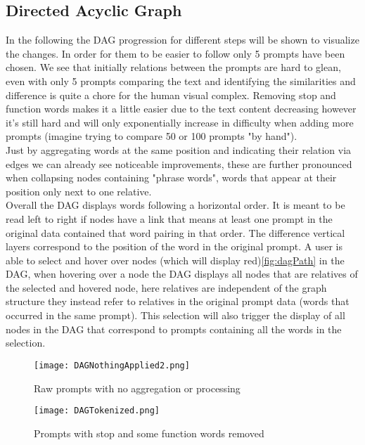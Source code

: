 \documentclass[
  a4paper,  %
  twoside,  %
  bibliography=totoc,
  headsepline,
  cleardoublepage=empty,
  parskip=half,
  draft=false
]{scrbook}
\begin{document}
\subsection{Directed Acyclic Graph}
In the following the DAG progression for different steps will be shown to visualize the changes. In order for them to be easier to follow only 5 prompts have been chosen. We see that initially relations between the prompts are hard to glean, even with only 5 prompts comparing the text and identifying the similarities and difference is quite a chore for the human visual complex. Removing stop and function words makes it a little easier due to the text content decreasing however it's still hard and will only exponentially increase in difficulty when adding more prompts (imagine trying to compare 50 or 100 prompts "by hand").\\
Just by aggregating words at the same position and indicating their relation via edges we can already see noticeable improvements, these are further pronounced when collapsing nodes containing "phrase words", words that appear at their position only next to one relative.\\
Overall the DAG displays words following a horizontal order. It is meant to be read left to right if nodes have a link that means at least one prompt in the original data contained that word pairing in that order. The difference vertical layers correspond to the position of the word in the original prompt. A user is able to select and hover over nodes (which will display red)\cref{fig:dagPath} in the DAG, when hovering over a node the DAG displays all nodes that are relatives of the selected and hovered node, here relatives are independent of the graph structure they instead refer to relatives in the original prompt data (words that occurred in the same prompt). This selection will also trigger the display of all nodes in the DAG that correspond to prompts containing all the words in the selection.
\begin{figure}[H]        %
	\centering           %
	\texttt{[image: DAGNothingApplied2.png]}
	\caption{Raw prompts with no aggregation or processing}
	\label{fig:dagPure}  %
\end{figure}
\begin{figure}[H]        %
	\centering           %
	\texttt{[image: DAGTokenized.png]}
	\caption{Prompts with stop and some function words removed}
	\label{fig:dagTokenized}  %
\end{figure}
\end{document}
